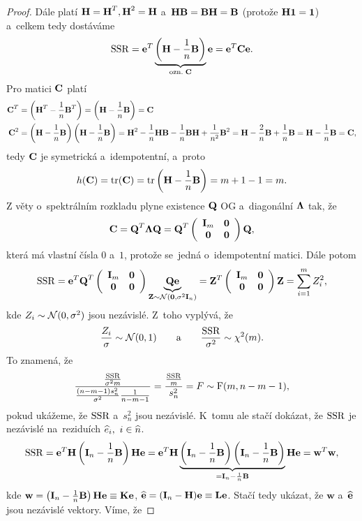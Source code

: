 \begin{proof}
Dále platí $\textbf{H} = \textbf{H}^T, \textbf{H}^2 = \textbf{H}$ a~$\textbf{H} \textbf{B} = \textbf{B} \textbf{H} = \textbf{B}$ (protože $\textbf{H} \mathbf{1} = \mathbf{1}$) a~celkem tedy dostáváme
 $$
\mathrm{SSR} = \mathbf{e}^T \underbrace{\left(\textbf{H} - \frac{1}{n} \textbf{B} \right)}_{\text{ozn.} \; \textbf{C}} \mathbf{e} = \mathbf{e}^T \textbf{C} \mathbf{e}.
 $$
Pro matici $\textbf{C}$ platí
\begin{align*}
\textbf{C}^T & = \left(\textbf{H}^T - \frac{1}{n} \textbf{B}^T \right) = \left(\textbf{H} - \frac{1}{n} \textbf{B} \right) = \textbf{C} \\
\textbf{C}^2 & = \left(\textbf{H} - \frac{1}{n} \textbf{B} \right)\left(\textbf{H} - \frac{1}{n} \textbf{B} \right) = \textbf{H}^2 - \frac{1}{n} \textbf{H} \textbf{B} - \frac{1}{n} \textbf{B} \textbf{H} + \frac{1}{n^2} \textbf{B}^2 = \textbf{H} - \frac{2}{n} \textbf{B} + \frac{1}{n} \textbf{B} = \textbf{H} - \frac{1}{n} \textbf{B} = \textbf{C},
\end{align*}
tedy $\textbf{C}$ je symetrická a~idempotentní, a~proto
 $$
h(\textbf{C}) = \mathrm{tr}(\textbf{C}) = \mathrm{tr} \left(\textbf{H} - \frac{1}{n} \textbf{B} \right) = m + 1 - 1 = m.
 $$
Z věty o~spektrálním rozkladu plyne existence $\textbf{Q}$ OG a~diagonální $\mathbf{\Lambda}$ tak, že
 $$ \textbf{C} = \textbf{Q}^T \mathbf{\Lambda} \textbf{Q} = \textbf{Q}^T \left(\begin{array}{cc}
\textbf{I}_{m}&\boldsymbol{0}  \\
\boldsymbol{0}& \boldsymbol{0}
\end{array}
 \right)\textbf{Q}, $$
která má vlastní čísla $0$ a~$1$, protože se~jedná o~idempotentní matici. Dále potom
 $$ \mathrm{SSR} = \mathbf{e}^T\textbf{Q}^T\left(\begin{array}{cc}
 \textbf{I}_{m}&\boldsymbol{0}  \\
 \boldsymbol{0}& \boldsymbol{0}
 \end{array}
 \right)\underbrace{\textbf{Q}\mathbf{e}}_{\mathbf{Z}\sim\mathcal{N}(\boldsymbol{0},\sigma^2 \textbf{I}_{n})} = \mathbf{Z}^T\left(\begin{array}{cc}
 \textbf{I}_{m}&\boldsymbol{0}  \\
 \boldsymbol{0}& \boldsymbol{0}
 \end{array}
 \right)\mathbf{Z} = \sum_{i=1}^m Z_i^2, $$
 kde $Z_i\sim\mathcal{N}(0,\sigma^2)$ jsou nezávislé. Z~toho vyplývá, že
 $$ \frac{Z_i}{\sigma}\sim\mathcal{N}(0,1)\qquad\text{a}\qquad\frac{\mathrm{SSR}}{\sigma^2}\sim\chi^2(m). $$
 To znamená, že
 $$ \frac{\frac{\mathrm{SSR}}{\sigma^2 m}}{\frac{(n-m-1)s_n^2}{\sigma^2}\frac{1}{n-m-1}} = \frac{\frac{\mathrm{SSR}}{m}}{s_n^2} = F\sim \mathrm{F}(m,n-m-1), $$
 pokud ukážeme, že $\mathrm{SSR}$ a~$s_n^2$ jsou nezávislé. K~tomu ale stačí dokázat, že $\mathrm{SSR}$ je nezávislé na~reziduích $\widehat{e}_i,~i\in\widehat{n}$.
 $$ \mathrm{SSR} = \mathbf{e}^T\textbf{H}\left(\textbf{I}_{n}-\frac{1}{n}\textbf{B} \right)\textbf{H}\mathbf{e} = \mathbf{e}^T\textbf{H}\underbrace{\left(\textbf{I}_{n}-\frac{1}{n}\textbf{B}\right)\left(\textbf{I}_{n}-\frac{1}{n}\textbf{B}\right)}_{ = \textbf{I}_{n}-\frac{1}{n}\textbf{B}}\textbf{H}\mathbf{e} = \textbf{w}^T\textbf{w}, $$
 kde $\textbf{w} = \left(\textbf{I}_{n}-\frac{1}{n}\textbf{B}\right)\textbf{H}\mathbf{e}\equiv \textbf{K}\mathbf{e}$, $\widehat{\mathbf{e}} = (\textbf{I}_{n}-\textbf{H})\mathbf{e}\equiv \textbf{L}\mathbf{e}$. Stačí tedy ukázat, že $\textbf{w}$ a~$\widehat{\mathbf{e}}$ jsou nezávislé vektory. Víme, že

\end{proof}
